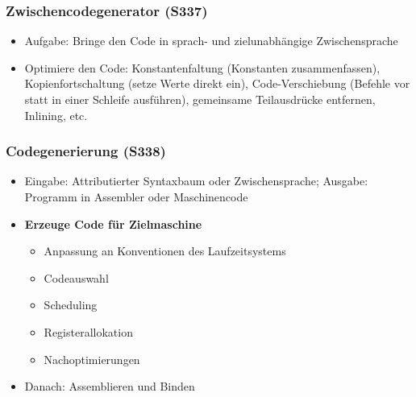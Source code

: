\subsubsection{Zwischencodegenerator (S337)}
\begin{itemize}
	\item Aufgabe: Bringe den Code in sprach- und zielunabhängige Zwischensprache
	\item Optimiere den Code: Konstantenfaltung (Konstanten zusammenfassen), Kopienfortschaltung (setze Werte direkt ein), Code-Verschiebung (Befehle vor statt in einer Schleife ausführen), gemeinsame Teilausdrücke entfernen, Inlining, etc.
\end{itemize}

\subsubsection{Codegenerierung (S338)}
\begin{itemize}
	\item Eingabe: Attributierter Syntaxbaum oder Zwischensprache; Ausgabe: Programm in Assembler oder Maschinencode
	\item \textbf{Erzeuge Code für Zielmaschine}
	\begin{itemize}
		\item Anpassung an Konventionen des Laufzeitsystems
		\item Codeauswahl
		\item Scheduling
		\item Registerallokation
		\item Nachoptimierungen
	\end{itemize}
	\item Danach: Assemblieren und Binden
\end{itemize}


